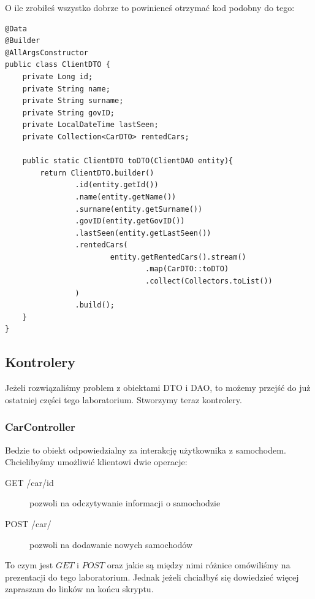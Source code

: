 \documentclass{article}
\begin{document}
                O ile zrobiłeś wszystko dobrze to powinieneś otrzymać kod podobny do tego:
                \begin{verbatim}
@Data
@Builder
@AllArgsConstructor
public class ClientDTO {
    private Long id;
    private String name;
    private String surname;
    private String govID;
    private LocalDateTime lastSeen;
    private Collection<CarDTO> rentedCars;

    public static ClientDTO toDTO(ClientDAO entity){
        return ClientDTO.builder()
                .id(entity.getId())
                .name(entity.getName())
                .surname(entity.getSurname())
                .govID(entity.getGovID())
                .lastSeen(entity.getLastSeen())
                .rentedCars(
                        entity.getRentedCars().stream()
                                .map(CarDTO::toDTO)
                                .collect(Collectors.toList())
                )
                .build();
    }
}
                \end{verbatim}
        \subsection{Kontrolery}
            Jeżeli rozwiązaliśmy problem z obiektami DTO i DAO, to możemy przejść do już ostatniej części tego laboratorium. Stworzymy teraz kontrolery.
            \subsubsection{CarController}
                Bedzie to obiekt odpowiedzialny za interakcję użytkownika z samochodem. Chcielibyśmy umożliwić klientowi dwie operacje:
                \begin{description}
                    \item[GET /car/{id}] pozwoli na odczytywanie informacji o samochodzie 
                    \item[POST /car/]  pozwoli na dodawanie nowych samochodów
                \end{description}
                To czym jest $GET$ i $POST$ oraz jakie są między nimi różnice omówiliśmy na prezentacji do tego laboratorium. Jednak jeżeli chciałbyś się dowiedzieć więcej zapraszam do linków na końcu skryptu.
                
\end{document}
